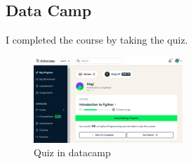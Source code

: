  
\subsection{Data Camp}

I completed the course by taking the quiz. 
\begin{figure}[h]
  \centering
  \includegraphics[width=0.5\textwidth]{image/Datacamp.png}
  \caption{Quiz in datacamp}
  \label{fig:data_camp}
\end{figure}